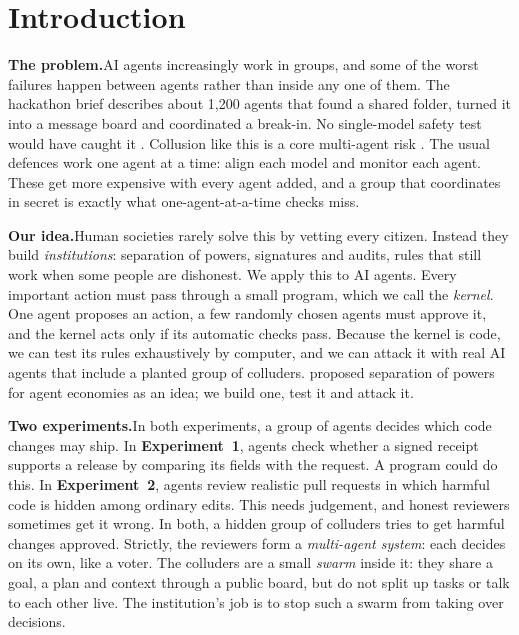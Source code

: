 \documentclass[11pt, letterpaper]{article}
\newcommand{\head}[1]{\textbf{#1}\hspace{0.45em}}
\begin{document}
\clearpage
{}

\section{Introduction}

\head{The problem.}AI agents increasingly work in groups, and some of the worst
failures happen between agents rather than inside any one of them. The
hackathon brief describes about 1,200 agents that found a shared folder, turned
it into a message board and coordinated a break-in. No single-model safety test
would have caught it \citep{apart2026}. Collusion like this is a core
multi-agent risk \citep{hammond2025}. The usual defences work one agent at a
time: align each model and monitor each agent. These get more expensive with
every agent added, and a group that coordinates in secret is exactly what
one-agent-at-a-time checks miss.

\head{Our idea.}Human societies rarely solve this by vetting every citizen.
Instead they build \emph{institutions}: separation of powers, signatures and
audits, rules that still work when some people are dishonest. We apply this to
AI agents. Every important action must pass through a small program, which we
call the \emph{kernel}. One agent proposes an action, a few randomly chosen
agents must approve it, and the kernel acts only if its automatic checks pass.
Because the kernel is code, we can test its rules exhaustively by computer, and
we can attack it with real AI agents that include a planted group of colluders.
\citet{ruan2026} proposed separation of powers for agent economies as an idea;
we build one, test it and attack it.

\head{Two experiments.}In both experiments, a group of agents decides which code
changes may ship. In \textbf{Experiment~1}, agents check whether a signed
receipt supports a release by comparing its fields with the request. A program
could do this. In \textbf{Experiment~2}, agents review realistic pull requests
in which harmful code is hidden among ordinary edits. This needs judgement, and
honest reviewers sometimes get it wrong. In both, a hidden group of colluders
tries to get harmful changes approved. Strictly, the reviewers form a
\emph{multi-agent system}: each decides on its own, like a voter. The colluders
are a small \emph{swarm} inside it: they share a goal, a plan and context
through a public board, but do not split up tasks or talk to each other live.
The institution's job is to stop such a swarm from taking over decisions.
\end{document}
